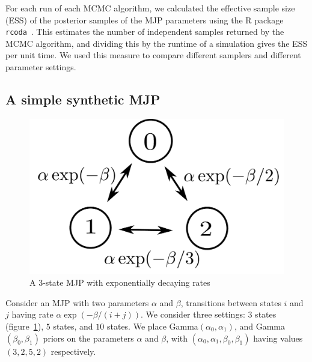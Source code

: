 For each run of each MCMC algorithm, we calculated the effective sample size (ESS) of the posterior samples of the MJP parameters using the R package \texttt{rcoda}~\citep{Rcoda2006}. 
This estimates the number of independent samples returned by the MCMC algorithm, and dividing this by the runtime of a simulation gives the ESS per unit time. 
We used this measure to compare different samplers and different parameter settings.

\subsection{A simple synthetic MJP}
\begin{figure}
    \vspace{-.3in}
  \begin{minipage}[!hp]{.05\linewidth}
    \hspace{.1in}
  \end{minipage}
  \begin{minipage}[!hp]{.9\linewidth}
  \centering
    \includegraphics [width=\textwidth, angle=0]{figs/exp_model.pdf}
    \caption{A 3-state MJP with exponentially decaying rates}
    \label{fig:exp_model}
      \end{minipage}
  \end{figure}
Consider an MJP with two parameters $\alpha$ and $\beta$, transitions between states $i$ and $j$ having rate $\alpha \exp(-\beta/(i+j))$.
We consider three settings: $3$ states (figure~\ref{fig:exp_model}),
$5$ states, and $10$ states.
We place Gamma$(\alpha_0,\alpha_1)$, and Gamma$(\beta_0, \beta_1)$ priors on the parameters $\alpha$ and $\beta$, with $(\alpha_0,\alpha_1,\beta_0,\beta_1)$ having values $(3,2,5,2)$ respectively. 
